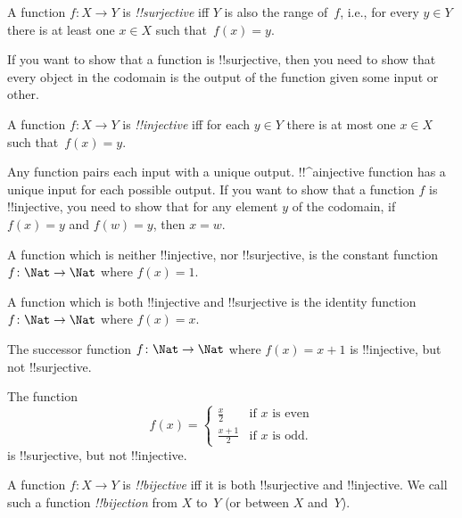 \documentclass[../../include/open-logic-section]{subfiles}
\begin{document}

\begin{defn}
A function $f \colon X \rightarrow Y$ is \emph{!!{surjective}} iff $Y$
is also the range of~$f$, i.e., for every $y \in Y$ there is at least
one $x \in X$ such that~$f(x) = y$.
\end{defn}

\begin{explain}
If you want to show that a function is !!{surjective}, then you need
to show that every object in the codomain is the output of the
function given some input or other.
\end{explain}

\begin{defn}
A function $f \colon X \rightarrow Y$ is \emph{!!{injective}} iff for
each $y \in Y$ there is at most one $x \in X$ such that~$f(x) = y$.
\end{defn}

\begin{explain}
Any function pairs each input with a unique output. !!^a{injective}
function has a unique input for each possible output. If you want to
show that a function $f$ is !!{injective}, you need to show that for
any element $y$ of the codomain, if $f(x)=y$ and $f(w)=y$, then $x=w$.

A function which is neither !!{injective}, nor !!{surjective}, is the
constant function $f\colon \Nat \rightarrow \Nat$ where $f(x) = 1$.
    
A function which is both !!{injective} and !!{surjective} is the
identity function $f\colon \Nat \rightarrow \Nat$ where $f(x) = x$.

The successor function $f \colon \Nat \rightarrow \Nat$ where $f(x) =
x+1$ is !!{injective}, but not !!{surjective}.

The function 
\[
f(x) = 
\begin{cases}
  \frac{x}{2} & \text{if $x$ is even} \\
  \frac{x+1}{2} & \text{if $x$ is odd.}
\end{cases}
\]
is !!{surjective}, but not !!{injective}.

\end{explain}

\begin{defn}
A function $f \colon X \to Y$ is \emph{!!{bijective}} iff it is both
!!{surjective} and !!{injective}.  We call such a function
 \emph{!!{bijection}} from $X$ to~$Y$ (or between
$X$ and~$Y$).
\end{defn}
\end{document}
